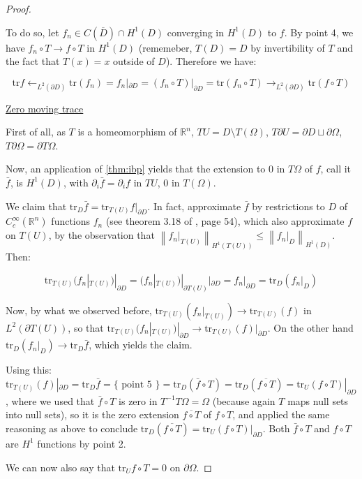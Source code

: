 \documentclass[english,a4paper,9pt,oneside]{scrbook}	%
\theoremstyle{break}
\newenvironment{mproof}[1][\proofname]{%
  \begin{proof}[#1]$ $\par\nobreak\ignorespaces
}{%
  \end{proof}
}
\renewcommand*{\proofname}{Proof}
\theoremstyle{remark}
\newcommand{\mR}{\mathbb{R}}
\newcommand{\norm}[1]{\left\lVert#1\right\rVert}
\newcommand{\tr}{\text{tr}}
\newcommand{\ind}[1]{\{\text{ #1 }\}}
\begin{document}
\begin{appendices}
\begin{mproof}
To do so, let $f_n \in C(\overline{D})\cap H^1(D)$ converging in $H^1(D)$ to $f$. By point 4, we have $f_n \circ T\rightarrow f\circ T$ in $H^1(D)$ (rememeber, $T(D)=D$ by invertibility of $T$ and the fact that $T(x)=x$ outside of $D$). Therefore we have:

$$\tr f \leftarrow_{L^2(\partial D)}\tr(f_n) = f_n|_{\partial D} = (f_n\circ T)|_{\partial D}= \tr(f_n \circ T)\rightarrow_{L^2(\partial D)} \tr(f \circ T)$$

\underline{Zero moving trace}

First of all, as $T$ is a homeomorphism of $\mR^{n}$, $TU=D\setminus T(\Omega)$, $T\partial U = \partial D \sqcup \partial \Omega$, $T\partial \Omega = \partial T \Omega$.

Now, an application of \cref{thm:ibp} yields that the extension to $0$ in $T\Omega$ of $f$, call it $\bar{f}$, is $H^1(D)$, with $\partial_i \bar{f}=\partial_i f$ in $TU$, $0$ in $T(\Omega)$.

We claim that $\tr_D \bar{f} = \tr_{T(U)} f|_{\partial D}$. In fact, approximate $\bar{f}$ by restrictions to $D$ of $C^\infty_c(\mR^n)$ functions $f_n$ (see theorem 3.18 of \cite{adams}, page 54), which also approximate $f$ on ${T(U)}$, by the observation that $\norm{f_n|_{T(U)}}_{H^1({T(U)})}\leq \norm{f_n|_D}_{H^1(D)}$. Then:

$$\tr_{T(U)}( f_n|_{T(U)})|_{\partial D} = (f_n|_{T(U)})|_{\partial {T(U)}}|_{\partial D} = f_n|_{\partial D} = \tr_D ( f_n|_D ) $$

Now, by what we observed before, $\tr_{T(U)}( f_n|_{T(U)})\rightarrow \tr_{T(U)}(f) $ in $L^2(\partial {T(U)})$, so that $\tr_{T(U)}( f_n|_{T(U)})|_{\partial D} \rightarrow \tr_{T(U)}( f)|_{\partial D}$. On the other hand $\tr_D ( f_n|_D ) \rightarrow \tr_D \bar{f}$, which yields the claim.

Using this: $ \tr_{T(U)}( f)|_{\partial D} = \tr_D \bar{f} = \ind{point 5} = \tr_D(\bar{f}\circ T) = \tr_D(\overline{f \circ T}) = \tr_U (f\circ T)|_{\partial D}$, where we used that $\bar{f}\circ T$ is zero in $T^{-1}T\Omega = \Omega$ (because again $T$ maps null sets into null sets), so it is the zero extension $\overline{f \circ T}$ of $f\circ T$, and applied the same reasoning as above to conclude $\tr_D(\overline{f \circ T}) = \tr_U (f\circ T)|_{\partial D}$. Both $\bar{f}\circ T$ and $f\circ T$ are $H^1$ functions by point 2.

We can now also say that $\tr_U f\circ T=0 $ on $\partial \Omega$.


\end{mproof}
\end{appendices}
\end{document}

